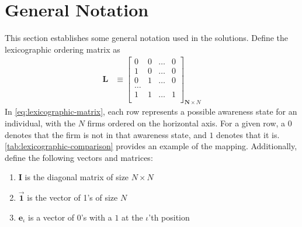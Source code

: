 \documentclass[12pt]{article}
\begin{document}
\section{General Notation}
This section establishes some general notation used in the solutions.
Define the lexicographic ordering matrix as
\begin{align}
	\mathbf{L} &\equiv \begin{bmatrix}0& 0& \ldots& 0\\
											1& 0& \ldots& 0\\
											0& 1& \ldots& 0\\
											\ldots\\
											1& 1& \ldots& 1\\
	\end{bmatrix}_{\mathbf{N} \times N}\label{eq:lexicographic-matrix}
\end{align}
In \cref{eq:lexicographic-matrix}, each row represents a possible awareness state for an individual, with the $N$ firms ordered on the horizontal axis.  For a given row, a $0$ denotes that the firm is not in that awareness state, and $1$ denotes that it is.  \cref{tab:lexicographic-comparison} provides an example of the mapping.  Additionally, define the following vectors and matrices:
\begin{enumerate}
	\item $\mathbf{I}$ is the diagonal matrix of size $N\times N$
	\item $\vec{\mathbf{1}}$ is the vector of 1's of size $N$
	\item $\mathbf{e}_{\iota}$ is a vector of 0's with a $1$ at the $\iota$'th position
\end{enumerate}
\end{document}
